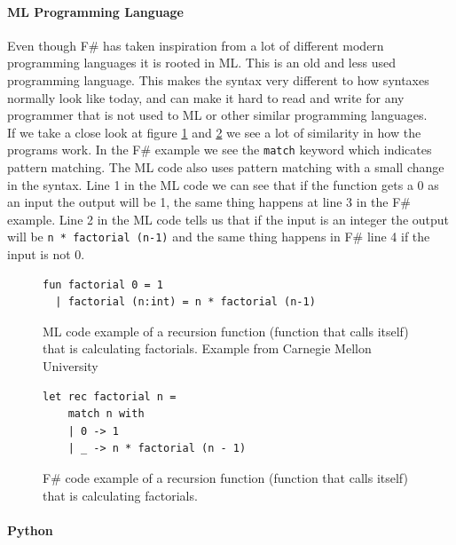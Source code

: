 \documentclass[12pt, a4paper]{article}
\newcommand{\code}[1]{{\small \texttt{#1}}}
\begin{document}
\paragraph{ML Programming Language}

Even though F\# has taken inspiration from a lot of different modern programming languages it is rooted in ML. This is an old and less used programming language. This makes the syntax very different to how syntaxes normally look like today, and can make it hard to read and write for any programmer that is not used to ML or other similar programming languages.\\

If we take a close look at figure \ref{fig:factorialMLExample} and \ref{fig:factorialFsharpExample} we see a lot of similarity in how the programs work. In the F\# example we see the \code{match} keyword which indicates pattern matching. The ML code also uses pattern matching with a small change in the syntax. Line 1 in the ML code we can see that if the function gets a 0 as an input the output will be 1, the same thing happens at line 3 in the F\# example. Line 2 in the ML code tells us that if the input is an integer the output will be \code{n * factorial (n-1)} and the same thing happens in F\# line 4 if the input is not 0.\\

\begin{figure}[!h]
	\begin{lstlisting}
fun factorial 0 = 1
  | factorial (n:int) = n * factorial (n-1)
	\end{lstlisting}
	\caption{ML code example of a recursion function (function that calls itself) that is calculating factorials. Example from Carnegie Mellon University\cite{carnegieMellon}}
	\label{fig:factorialMLExample}
\end{figure}

\begin{figure}[!h]
	\begin{lstlisting}
let rec factorial n =
    match n with
    | 0 -> 1
    | _ -> n * factorial (n - 1)
	\end{lstlisting}
	\caption{F\# code example of a recursion function (function that calls itself) that is calculating factorials.}
	\label{fig:factorialFsharpExample}
\end{figure}

\newpage
\paragraph{Python}
\end{document}
